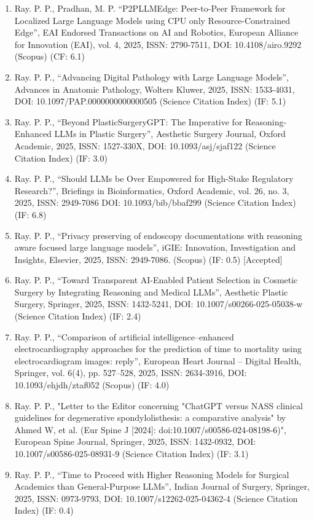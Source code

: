 \documentclass[11pt,a4paper]{moderncv}
\begin{document}
\begin{adjustwidth}{6em}{0pt}
\begin{enumerate}
		\item Ray. P. P., Pradhan, M. P. “P2PLLMEdge: Peer-to-Peer Framework for Localized Large Language Models using CPU only Resource-Constrained Edge”, EAI Endorsed Transactions on AI and Robotics, European Alliance for Innovation (EAI), vol. 4, 2025, ISSN: 2790-7511, DOI: 10.4108/airo.9292 (Scopus) (CF: 6.1)
		
		\item Ray. P. P., “Advancing Digital Pathology with Large Language Models”, Advances in Anatomic Pathology, Wolters Kluwer, 2025, ISSN: 1533-4031, DOI: 10.1097/PAP.0000000000000505 (Science Citation Index) (IF: 5.1)
		
		\item Ray. P. P., “Beyond PlasticSurgeryGPT: The Imperative for Reasoning-Enhanced LLMs in Plastic Surgery”, Aesthetic Surgery Journal, Oxford Academic, 2025, ISSN: 1527-330X, DOI: 10.1093/asj/sjaf122 (Science Citation Index) (IF: 3.0)
		
		\item Ray. P. P., “Should LLMs be Over Empowered for High-Stake Regulatory Research?”, Briefings in Bioinformatics, Oxford Academic, vol. 26, no. 3, 2025, ISSN: 2949-7086 DOI: 10.1093/bib/bbaf299 (Science Citation Index) (IF: 6.8)
		
		\item Ray. P. P., “Privacy preserving of endoscopy documentations with reasoning aware focused large language models”, iGIE: Innovation, Investigation and Insights, Elsevier, 2025, ISSN: 2949-7086. (Scopus) (IF: 0.5) [Accepted]
		
		\item Ray. P. P., “Toward Transparent AI-Enabled Patient Selection in Cosmetic Surgery by Integrating Reasoning and Medical LLMs”, Aesthetic Plastic Surgery, Springer, 2025, ISSN: 1432-5241, DOI: 10.1007/s00266-025-05038-w (Science Citation Index) (IF: 2.4) 
		
		\item Ray. P. P., “Comparison of artificial intelligence–enhanced electrocardiography approaches for the prediction of time to mortality using electrocardiogram images: reply”, European Heart Journal – Digital Health, Springer, vol. 6(4), pp. 527–528, 2025, ISSN: 2634-3916, DOI: 10.1093/ehjdh/ztaf052 (Scopus) (IF: 4.0)
		
		\item Ray. P. P.,  "Letter to the Editor concerning "ChatGPT versus NASS clinical guidelines for degenerative spondylolisthesis: a comparative analysis" by Ahmed W, et al. (Eur Spine J [2024]: doi:10.1007/s00586-024-08198-6)", European Spine Journal, Springer, 2025, ISSN: 1432-0932, DOI: 10.1007/s00586-025-08931-9 (Science Citation Index) (IF: 3.1)
		\item Ray. P. P., “Time to Proceed with Higher Reasoning Models for Surgical Academics than General-Purpose LLMs”, Indian Journal of Surgery, Springer, 2025, ISSN: 0973-9793, DOI: 10.1007/s12262-025-04362-4 (Science Citation Index) (IF: 0.4)
		

\end{enumerate}
\end{adjustwidth}
\end{document}
